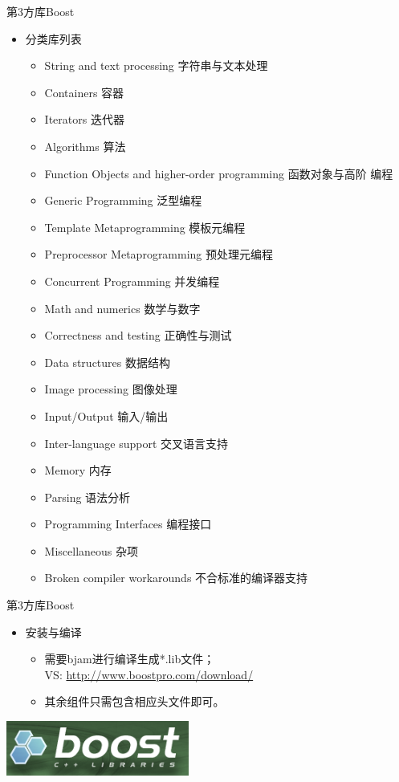 \begin{frame}[t, fragile]{第3方库}{Boost}%
  \begin{itemize}
  \item 分类库列表
    \begin{itemize}
      \scriptsize
    \item String and text processing 字符串与文本处理
    \item Containers 容器
    \item Iterators 迭代器
    \item Algorithms 算法
    \item Function Objects and higher-order programming 函数对象与高阶
      编程
    \item Generic Programming 泛型编程
    \item Template Metaprogramming 模板元编程
    \item Preprocessor Metaprogramming 预处理元编程
    \item Concurrent Programming 并发编程
    \item Math and numerics 数学与数字
    \item Correctness and testing 正确性与测试
    \item Data structures 数据结构
    \item Image processing 图像处理
    \item Input/Output 输入/输出
    \item Inter-language support 交叉语言支持
    \item Memory 内存
    \item Parsing 语法分析
    \item Programming Interfaces 编程接口
    \item Miscellaneous 杂项
    \item Broken compiler workarounds 不合标准的编译器支持
    \end{itemize}
  \end{itemize}
\end{frame}

\begin{frame}[t, fragile]{第3方库}{Boost}%
  \begin{itemize}
  \item 安装与编译
    \begin{itemize}
    \item {} 需要bjam进行编译生成*.lib文件；\\
        VS: {\url{http://www.boostpro.com/download/}}
      \item 其余组件只需包含相应头文件即可。
    \end{itemize}
  \end{itemize}
  \begin{center}
    \includegraphics[width=0.45\textwidth]{figure/chap07/12boost}
  \end{center}
\end{frame}

